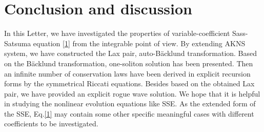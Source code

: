 \documentclass[12pt]{article}
\begin{document}
\section{Conclusion and discussion}
In this Letter, we have investigated the properties of variable-coefficient Sass-Satsuma equation \eqref{1} from the integrable point of view. By extending AKNS system, we have constructed the Lax pair, auto-B\"acklund transformation. Based on the B\"acklund transformation, one-soliton solution has been presented. Then an infinite number of conservation laws have been derived in explicit recursion forms by the symmetrical Riccati equations. Besides based on the obtained Lax pair, we have provided an explicit rogue wave solution. We hope that it is helpful in studying the nonlinear evolution equations like SSE. As the extended form of the SSE, Eq.\eqref{1} may contain some other specific meaningful cases with different coefficients to be investigated.

\small


\end{document}
